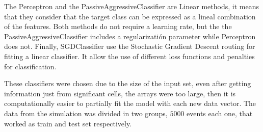 The Perceptron and the PassiveAggressiveClassifier are Linear methods, it means
that they consider that the target class can be expressed as a lineal
combination of the features\cite{LMsklearn,scikit-learn}. Both methods do not
require a learning rate, but the the PassiveAggressiveClassifier includes a
regularizatión parameter while Perceptron does not. Finally, SGDClassifier use
the Stochastic Gradient Descent routing for fitting a linear classifier. It
allow the use of different loss functions and penalties for
classification\cite{SGDsklearn,scikit-learn}.

These classifiers were chosen due to the size of the input set, even after
getting information just from significant cells, the arrays were too large,
then it is computationally easier to partially fit the model with each new data
vector. The data from the simulation was divided in two groups, \(5000\) events
each one, that worked as train and test set respectively.
